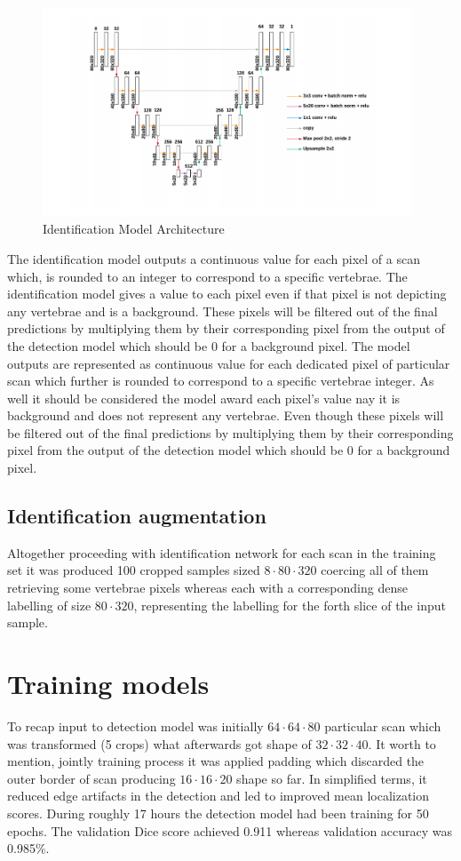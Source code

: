 \begin{figure}[h]
    \centering \includegraphics[width=11cm]{images/identification_model.png}
    \caption {Identification Model Architecture}
    \label{fig:identification_model}
\end{figure}

The identification model outputs a continuous value for each pixel of a scan which, is rounded to an integer to correspond to a specific vertebrae. The identification model gives a value to each pixel even if that pixel is not depicting any vertebrae and is a background. These pixels will be filtered out of the final predictions by multiplying them by their corresponding pixel from the output of the detection model which should be 0 for a background pixel. The model outputs are represented as continuous value for each dedicated pixel of particular scan which further is rounded to correspond to a specific vertebrae integer. As well it should be considered the model award each pixel's value nay it is background and does not represent any vertebrae. Even though these pixels will be filtered out of the final predictions by multiplying them by their corresponding pixel from the output of the detection model which should be 0 for a background pixel.

\subsection{Identification augmentation}
Altogether proceeding with identification network for each scan in the training set it was produced 100 cropped samples sized $8 \cdot 80 \cdot 320$ coercing all of them retrieving some vertebrae pixels whereas each with a corresponding dense labelling of size $80 \cdot 320$, representing the labelling for the forth slice of the input sample.

\section{Training models}
To recap input to detection model was initially $64 \cdot 64 \cdot 80$ particular scan which was transformed (5 crops) what afterwards got shape of $32 \cdot 32 \cdot 40$. It worth to mention, jointly training process it was applied padding which discarded the outer border of scan producing $16 \cdot 16 \cdot 20$ shape so far. In simplified terms, it reduced edge artifacts in the detection and led to improved mean localization scores. During roughly 17 hours the detection model had been training for 50 epochs. The validation Dice score achieved 0.911 whereas validation accuracy was 0.985\%. 

